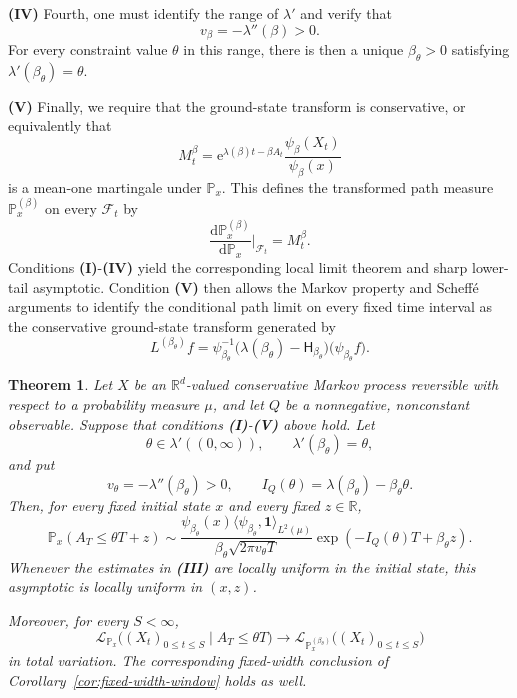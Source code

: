 \documentclass[11pt,reqno]{amsart}
\newtheorem{theorem}{Theorem}[section]
\theoremstyle{definition}
\numberwithin{equation}{section}
\newcommand{\<}{\langle}
\renewcommand{\>}{\rangle}
\def\R{{\mathbb R}}
\def\de{{\rm d}}
\def\de{{\mathrm {d}}}
\def\bbP{{\mathbb{P}}}
\begin{document}
\textbf{(IV)} Fourth, one must identify the range of $\lambda'$ and verify that
\[
    v_\beta=-\lambda''(\beta)>0.
\]
For every constraint value $\theta$ in this range, there is then a unique
$\beta_\theta>0$ satisfying $\lambda'(\beta_\theta)=\theta$.  

\textbf{(V)} Finally, we require that the ground-state transform is conservative,
or equivalently that
\[
    M_t^\beta
      =\mathrm e^{\lambda(\beta)t-\beta A_t}
        \frac{\psi_\beta(X_t)}{\psi_\beta(x)}
\]
is a mean-one martingale under $\bbP_x$.  This defines the transformed
path measure $\bbP_x^{(\beta)}$ on every $\mathcal F_t$ by
\[
    \frac{\de\bbP_x^{(\beta)}}{\de\bbP_x}\bigg|_{\mathcal F_t}
       =M_t^\beta.
\]
Conditions \textbf{(I)}-\textbf{(IV)} yield the corresponding local
limit theorem and sharp lower-tail asymptotic.  Condition \textbf{(V)}
then allows the Markov property and Scheff\'e arguments to identify the
conditional path limit on every fixed time interval as the conservative
ground-state transform generated by
\[
    L^{(\beta_\theta)}f
      =
      \psi_{\beta_\theta}^{-1}
      \bigl(\lambda(\beta_\theta)-\mathsf H_{\beta_\theta}\bigr)
      \bigl(\psi_{\beta_\theta}f\bigr).
\]


\begin{theorem}
\label{prop:reversible-extension-principle}
Let $X$ be an $\R^d$-valued conservative Markov process reversible with respect to a
probability measure $\mu$, and let $Q$ be a nonnegative, nonconstant
observable.  Suppose that conditions \textbf{(I)}-\textbf{(V)} above
hold.  Let
\[
    \theta\in\lambda'((0,\infty)),
    \qquad
    \lambda'(\beta_\theta)=\theta,
\]
and put
\[
    v_\theta=-\lambda''(\beta_\theta)>0,
    \qquad
    I_Q(\theta)
       =\lambda(\beta_\theta)-\beta_\theta\theta.
\]
Then, for every fixed initial state $x$ and every fixed $z\in\mathbb R$,
\[
    \bbP_x(A_T\leq\theta T+z)
    \sim
    \frac{
      \psi_{\beta_\theta}(x)
      \langle\psi_{\beta_\theta},\mathbf 1\rangle_{L^2(\mu)}
    }{
      \beta_\theta\sqrt{2\pi v_\theta T}
    }
    \exp\!\left(
       -I_Q(\theta)T+\beta_\theta z
    \right).
\]
Whenever the estimates in \textbf{(III)} are locally uniform in the
initial state, this asymptotic is locally uniform in $(x,z)$.

Moreover, for every $S<\infty$,
\[
    \mathcal L_{\bbP_x}
       \bigl((X_t)_{0\leq t\leq S}\mid A_T\leq\theta T\bigr)
    \longrightarrow
    \mathcal L_{\bbP_x^{(\beta_\theta)}}
       \bigl((X_t)_{0\leq t\leq S}\bigr)
\]
in total variation.  The corresponding fixed-width conclusion of
Corollary~\ref{cor:fixed-width-window} holds as well.
\end{theorem}
\end{document}
